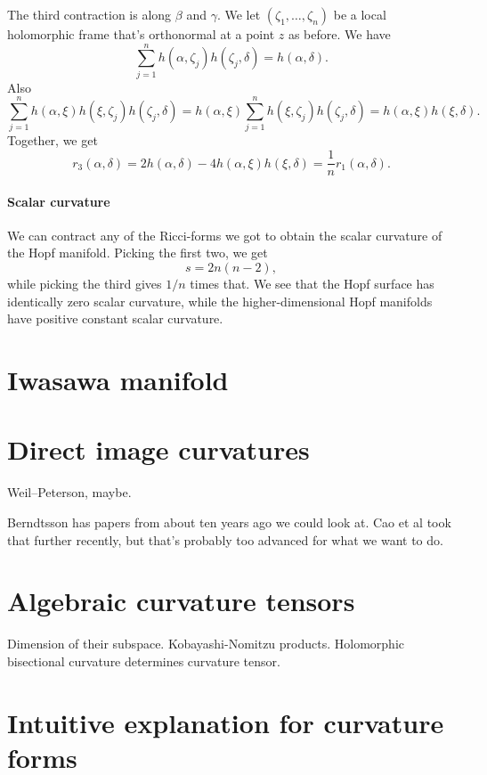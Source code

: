 \documentclass[11pt]{article}
\begin{document}
The third contraction is along \(\beta\) and \(\gamma\). We let \((\zeta_1, \ldots, \zeta_n)\) be a local holomorphic frame that's orthonormal at a point \(z\) as before. We have
$$
\sum_{j=1}^n h(\alpha, \zeta_j) h(\zeta_j, \delta)
= h(\alpha, \delta).
$$
Also
$$
\sum_{j=1}^n h(\alpha, \xi) h(\xi, \zeta_j) h(\zeta_j, \delta)
= h(\alpha, \xi) \sum_{j=1}^n  h(\xi, \zeta_j) h(\zeta_j, \delta)
= h(\alpha, \xi) h(\xi, \delta).
$$
Together, we get
$$
r_3(\alpha, \delta)
= 2 h(\alpha, \delta) - 4 h(\alpha, \xi) h(\xi, \delta)
= \frac{1}{n} r_1(\alpha, \delta).
$$

\paragraph{Scalar curvature}
\label{sec:orgf9212d2}

We can contract any of the Ricci-forms we got to obtain the scalar curvature of the Hopf manifold. Picking the first two, we get
$$
s = 2n(n-2),
$$
while picking the third gives \(1/n\) times that. We see that the Hopf surface has identically zero scalar curvature, while the higher-dimensional Hopf manifolds have positive constant scalar curvature.


\section{Iwasawa manifold}
\label{sec:orgd67c2ff}

\section{Direct image curvatures}
\label{sec:org5619e67}

Weil--Peterson, maybe.

Berndtsson has papers from about ten years ago we could look at. Cao et al took that further recently, but that's probably too advanced for what we want to do.


\section{Algebraic curvature tensors}
\label{sec:orga0722e9}

Dimension of their subspace.
Kobayashi-Nomitzu products.
Holomorphic bisectional curvature determines curvature tensor.


\section{Intuitive explanation for curvature forms}
\label{sec:org2b43ecb}
\end{document}
